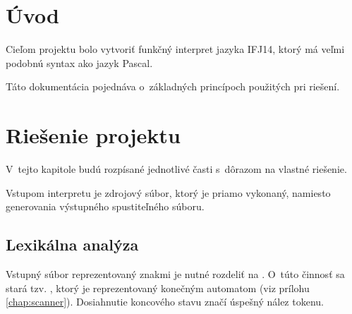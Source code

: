 \documentclass[12pt,a4paper,titlepage,final]{article}
\begin{document}

\def\author{TODO}
\def\email{xloginXX@stud.fit.vutbr.cz}
\def\projname{Interpret jazyka IFJ14}



\pagestyle{plain}
\setcounter{page}{1}
\tableofcontents

\newpage
\pagestyle{plain}
\setcounter{page}{1}

\section{Úvod} \label{uvod}

Cieľom projektu bolo vytvoriť funkčný interpret jazyka IFJ14, ktorý má veľmi
 podobnú syntax ako jazyk Pascal.

Táto dokumentácia pojednáva o~základných princípoch použitých pri riešení.


\section{Riešenie projektu} \label{riesenie}
V~tejto kapitole budú rozpísané jednotlivé časti s~dôrazom na vlastné riešenie.

Vstupom interpretu je zdrojový súbor, ktorý je priamo vykonaný, namiesto
generovania výstupného spustiteľného súboru.
\subsection{Lexikálna analýza}
Vstupný súbor reprezentovaný znakmi je nutné rozdeliť na .
O~túto činnosť sa stará tzv. , ktorý je reprezentovaný konečným
automatom (viz prílohu \ref{chap:scanner}). Dosiahnutie koncového stavu
značí úspešný nález tokenu.
\end{document}
